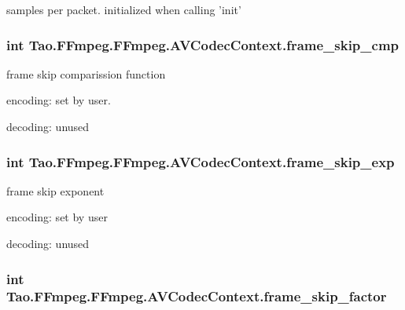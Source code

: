\label{struct_tao_1_1_f_fmpeg_1_1_f_fmpeg_1_1_a_v_codec_context_af3893a4c2663a5a1ff6a4a59a5335312}
samples per packet. initialized when calling 'init' \hypertarget{struct_tao_1_1_f_fmpeg_1_1_f_fmpeg_1_1_a_v_codec_context_a2408e33bb5a7e6131a450db2437b74ca}{
\subsubsection[{frame\_\-skip\_\-cmp}]{\setlength{\rightskip}{0pt plus 5cm}int {\bf Tao.FFmpeg.FFmpeg.AVCodecContext.frame\_\-skip\_\-cmp}}}
\label{struct_tao_1_1_f_fmpeg_1_1_f_fmpeg_1_1_a_v_codec_context_a2408e33bb5a7e6131a450db2437b74ca}
frame skip comparission function
\begin{DoxyItemize}
\item encoding: set by user.
\item decoding: unused 
\end{DoxyItemize}\hypertarget{struct_tao_1_1_f_fmpeg_1_1_f_fmpeg_1_1_a_v_codec_context_a2f9bc3243bf801b53e52231160e60308}{
\subsubsection[{frame\_\-skip\_\-exp}]{\setlength{\rightskip}{0pt plus 5cm}int {\bf Tao.FFmpeg.FFmpeg.AVCodecContext.frame\_\-skip\_\-exp}}}
\label{struct_tao_1_1_f_fmpeg_1_1_f_fmpeg_1_1_a_v_codec_context_a2f9bc3243bf801b53e52231160e60308}
frame skip exponent
\begin{DoxyItemize}
\item encoding: set by user
\item decoding: unused 
\end{DoxyItemize}\hypertarget{struct_tao_1_1_f_fmpeg_1_1_f_fmpeg_1_1_a_v_codec_context_a0368864715fb8b34f45b1f3f41c3cded}{
\subsubsection[{frame\_\-skip\_\-factor}]{\setlength{\rightskip}{0pt plus 5cm}int {\bf Tao.FFmpeg.FFmpeg.AVCodecContext.frame\_\-skip\_\-factor}}}
